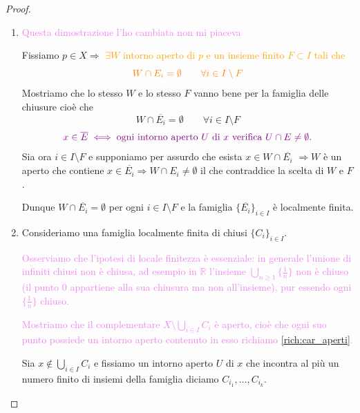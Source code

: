         \begin{proof}
        \mbox{}
        \begin{enumerate}
            \item \textcolor{violet}{Questa dimostrazione l'ho cambiata non mi piaceva}   
            
            Fissiamo $p \in X \Rightarrow$ \textcolor{orange}{$\exists W$ intorno aperto di $p$ e un insieme finito
            $F \subset I$ tali che}
            \[
            \color{orange} W \cap E_i = \emptyset \qquad \forall i \in I \setminus F
            \]
            Mostriamo che lo stesso $W$ e lo stesso $F$ vanno bene per la famiglia delle chiusure
            cioè che
            \[
            W \cap \overline{E_i} = \emptyset \qquad \forall i \in I \setminus F
            \]
            \[
            \color{violet} x \in \overline{E} \iff \text{ogni intorno aperto } U \text{ di } x \text{ verifica } U \cap E \neq \emptyset.
            \]
            Sia ora $i \in I \setminus F$ e supponiamo per assurdo che esista $x \in W \cap \overline{E_i}$
            $\Rightarrow W$ è un aperto che contiene $x \in \overline{E_i} \Rightarrow W \cap E_i \neq \emptyset$ il che contraddice la scelta di $W$ e $F$.

            Dunque $W \cap \overline{E_i} = \emptyset$ per ogni $i \in I \setminus F$
            e la famiglia $\{\overline{E_i}\}_{i \in I}$ è localmente finita.
            \item Consideriamo una famiglia localmente finita di chiusi $\{C_i\}_{i \in I}$. 
            
            \textcolor{violet}{Osserviamo che l'ipotesi di locale finitezza è essenziale: in generale l'unione di
            infiniti chiusi non è chiusa, ad esempio in $\mathbb{R}$ l'insieme
            $\displaystyle \bigcup_{n \geq 1} \{\tfrac{1}{n}\}$ non è chiuso (il punto $0$ appartiene alla sua chiusura ma non
            all'insieme), pur essendo ogni $\{\tfrac{1}{n}\}$ chiuso.}

            \textcolor{violet}{Mostriamo che il complementare $X \setminus \bigcup_{i \in I} C_i$ è aperto, cioè che ogni suo punto
            possiede un intorno aperto contenuto in esso richiamo \ref{rich:car_aperti}.}

            Sia $\displaystyle x \notin \bigcup_{i \in I} C_i$ e fissiamo un intorno aperto $U$ di $x$ che incontra al più un numero 
            finito di insiemi della famiglia diciamo $C_{i_1}, \dots, C_{i_k}$.
            

\end{enumerate}
\end{proof}
